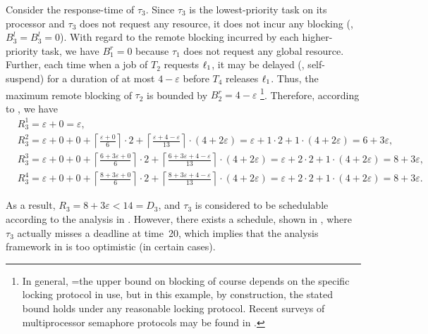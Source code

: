 Consider the response-time of $\tau_3$. Since $\tau_3$ is the lowest-priority task on its processor and $\tau_3$ does not request any resource, it does not incur any blocking (\ie, $B_3^l = B_3^l = 0$). With regard to the remote blocking incurred by each higher-priority task, we have $B_1^r = 0$ because $\tau_1$ does not request any global resource. Further, each time when a job of $T_2$ requests $\ell_1$, it may be delayed (\ie, self-suspend) for a duration of at most $4-\varepsilon$ before $T_4$ releases $\ell_1$. Thus, the maximum remote blocking of $\tau_2$ is bounded by $B_2^r = 4-\varepsilon$ \footnote{In general, =the upper bound on blocking of course depends on the specific locking protocol in use, but in this example, by construction, the stated bound holds under any reasonable locking protocol. Recent surveys of multiprocessor semaphore protocols may be found in \cite{bbb-2013,yang-2015}.}. Therefore, according to , we have
\begin{align*}
& R_3^1 = \varepsilon + 0 = \varepsilon, \\
& R_3^2 = \varepsilon + 0 + 0 + \left \lceil \frac{\varepsilon + 0}{6} \right \rceil \cdot 2 + \left \lceil \frac{\varepsilon + 4 - \varepsilon}{13} \right \rceil \cdot (4+2\varepsilon) = \varepsilon + 1 \cdot 2 + 1 \cdot (4+2\varepsilon) = 6+3\varepsilon, \\
& R_3^3 = \varepsilon + 0 + 0 + \left \lceil \frac{6+3\varepsilon + 0}{6} \right \rceil \cdot 2 + \left \lceil \frac{6+3\varepsilon + 4-\varepsilon}{13} \right \rceil \cdot (4+2\varepsilon) = \varepsilon + 2 \cdot 2 + 1 \cdot (4+2\varepsilon) = 8+3\varepsilon, \\
& R_3^4 = \varepsilon + 0 + 0 + \left \lceil \frac{8+3\varepsilon + 0}{6} \right \rceil \cdot 2 + \left \lceil \frac{8+3\varepsilon + 4-\varepsilon}{13} \right \rceil \cdot (4+2\varepsilon) = \varepsilon + 2 \cdot 2 + 1 \cdot (4+2\varepsilon) = 8+3\varepsilon.
\end{align*}
 
As a result, $R_3 = 8+3\varepsilon < 14 = D_3$, and $\tau_3$ is considered to be schedulable according to the analysis in \cite{lakshmanan-2009}. However, there exists a schedule, shown in , where $\tau_3$  actually misses a deadline at time~20, which implies that the analysis framework in \cite{lakshmanan-2009} is too optimistic (in certain cases). 

